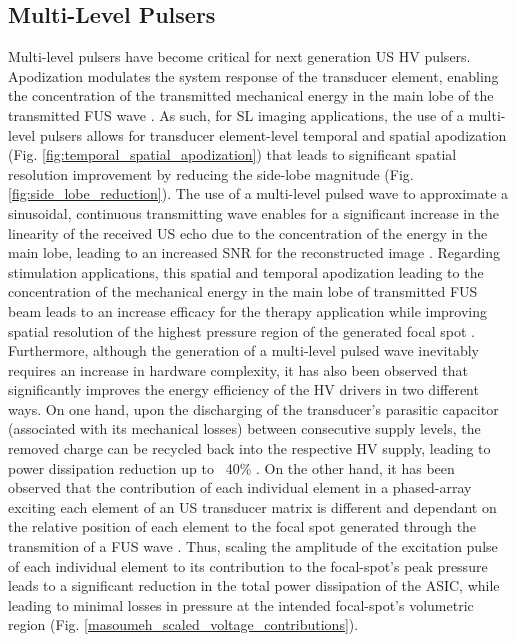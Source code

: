 \subsection{Multi-Level Pulsers}
\label{subsec:multilevel_pulsers}

Multi-level pulsers have become critical for next generation US HV pulsers. Apodization modulates the system response of the transducer element, enabling the concentration of the transmitted mechanical energy in the main lobe of the transmitted FUS wave \cite{SzaboElementApodization}. As such, for SL imaging applications, the use of a multi-level pulsers allows for transducer element-level temporal and spatial apodization (Fig. \ref{fig:temporal_spatial_apodization}) that leads to significant spatial resolution improvement by reducing the side-lobe magnitude (Fig. \ref{fig:side_lobe_reduction}). The use of a multi-level pulsed wave to approximate a sinusoidal, continuous transmitting wave enables for a significant increase in the linearity of the received US echo due to the concentration of the energy in the main lobe, leading to an increased SNR for the reconstructed image \cite{SzaboSpatialResolutionImage}. Regarding stimulation applications, this spatial and temporal apodization leading to the concentration of the mechanical energy in the main lobe of transmitted FUS beam leads to an increase efficacy for the therapy application while improving spatial resolution of the highest pressure region of the generated focal spot \cite{}. Furthermore, although the generation of a multi-level pulsed wave inevitably requires an increase in hardware complexity,  it has also been observed that significantly improves the energy efficiency of the HV drivers in two different ways. On one hand, upon the discharging of the transducer's parasitic capacitor (associated with its mechanical losses) between consecutive supply levels, the removed charge can be recycled back into the respective HV supply, leading to power dissipation reduction up to ~40\% \cite{ChaoChenReviewPaperRef38}. On the other hand, it has been observed that the contribution of each individual element in a phased-array exciting each element of an US transducer matrix is different and dependant on the relative position of each element to the focal spot generated through the transmition of a FUS wave \cite{MasoumehIUSPublication,AssociatiedRefs}. Thus, scaling the amplitude of the excitation pulse of each individual element to its contribution to the focal-spot's peak pressure leads to a significant reduction in the total power dissipation of the ASIC, while leading to minimal losses in pressure at the intended focal-spot's volumetric region (Fig. \ref{masoumeh_scaled_voltage_contributions}). 


